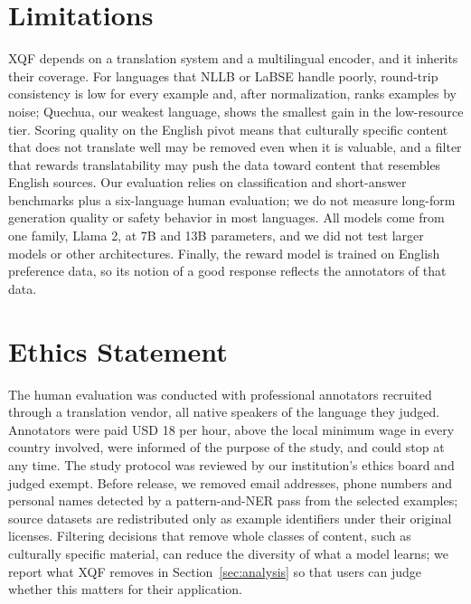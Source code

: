 \documentclass{article}
\begin{document}
\section*{Limitations}

XQF depends on a translation system and a multilingual encoder, and it inherits their coverage. For languages that NLLB or LaBSE handle poorly, round-trip consistency is low for every example and, after normalization, ranks examples by noise; Quechua, our weakest language, shows the smallest gain in the low-resource tier. Scoring quality on the English pivot means that culturally specific content that does not translate well may be removed even when it is valuable, and a filter that rewards translatability may push the data toward content that resembles English sources. Our evaluation relies on classification and short-answer benchmarks plus a six-language human evaluation; we do not measure long-form generation quality or safety behavior in most languages. All models come from one family, Llama 2, at 7B and 13B parameters, and we did not test larger models or other architectures. Finally, the reward model is trained on English preference data, so its notion of a good response reflects the annotators of that data.

\section*{Ethics Statement}

The human evaluation was conducted with professional annotators recruited through a translation vendor, all native speakers of the language they judged. Annotators were paid USD 18 per hour, above the local minimum wage in every country involved, were informed of the purpose of the study, and could stop at any time. The study protocol was reviewed by our institution's ethics board and judged exempt. Before release, we removed email addresses, phone numbers and personal names detected by a pattern-and-NER pass from the selected examples; source datasets are redistributed only as example identifiers under their original licenses. Filtering decisions that remove whole classes of content, such as culturally specific material, can reduce the diversity of what a model learns; we report what XQF removes in Section~\ref{sec:analysis} so that users can judge whether this matters for their application.
\end{document}
